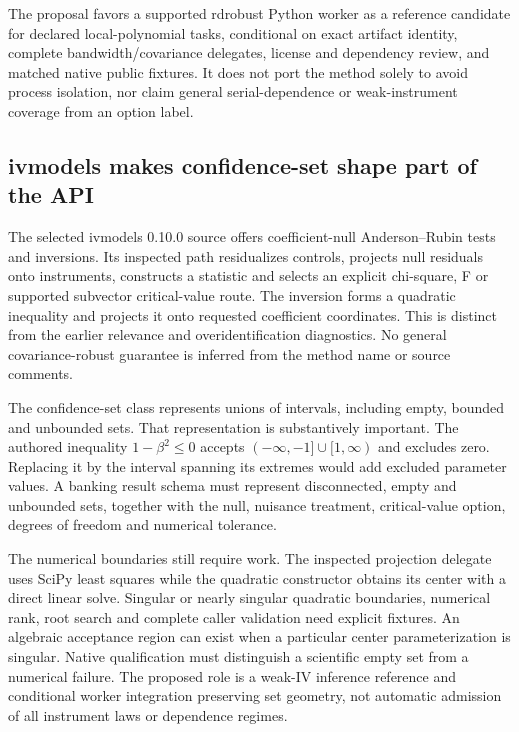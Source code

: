 The proposal favors a supported rdrobust Python worker as a reference
candidate for declared local-polynomial tasks, conditional on exact artifact
identity, complete bandwidth/covariance delegates, license and dependency
review, and matched native public fixtures. It does not port the method
solely to avoid process isolation, nor claim general serial-dependence or
weak-instrument coverage from an option label.
\citep{exec25_pyrdiv_choice}

\subsection{ivmodels makes confidence-set shape part of the API}
The selected ivmodels 0.10.0 source offers coefficient-null Anderson--Rubin
tests and inversions. Its inspected path residualizes controls, projects
null residuals onto instruments, constructs a statistic and selects an
explicit chi-square, F or supported subvector critical-value route.
The inversion forms a quadratic inequality and projects it onto requested
coefficient coordinates. This is distinct from the earlier relevance and
overidentification diagnostics. No general covariance-robust guarantee is
inferred from the method name or source comments.
\citep{exec25_pyrdiv_ivmodels}

The confidence-set class represents unions of intervals, including empty,
bounded and unbounded sets. That representation is substantively important.
The authored inequality $1-\beta^2\leq0$ accepts
$(-\infty,-1]\cup[1,\infty)$ and excludes zero. Replacing it by the
interval spanning its extremes would add excluded parameter values.
A banking result schema must represent disconnected, empty and unbounded
sets, together with the null, nuisance treatment, critical-value option,
degrees of freedom and numerical tolerance.~\citep{exec25_pyrdiv_ivmodels,
exec25_pyrdiv_choice}

The numerical boundaries still require work. The inspected projection
delegate uses SciPy least squares while the quadratic constructor obtains
its center with a direct linear solve. Singular or nearly singular
quadratic boundaries, numerical rank, root search and complete caller
validation need explicit fixtures. An algebraic acceptance region can
exist when a particular center parameterization is singular. Native
qualification must distinguish a scientific empty set from a numerical
failure. The proposed role is a weak-IV inference reference and conditional
worker integration preserving set geometry, not automatic admission of
all instrument laws or dependence regimes.~\citep{exec25_pyrdiv_ivmodels,
exec25_pyrdiv_choice}


